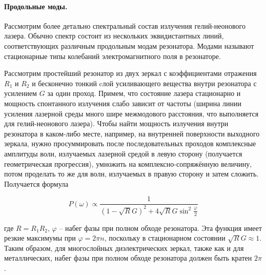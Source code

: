 \documentclass[a4paper,12pt]{article}
\theoremstyle{definition}
\begin{document}
\paragraph{Продольные моды.} Рассмотрим более детально спектральный состав излучения гелий-неонового 
лазера. Обычно спектр состоит из нескольких эквидистантных линий, соответствующих различным продольным
модам резонатора. Модами называют стационарные типы колебаний электромагнитного поля в резонаторе.
\par Рассмотрим простейший резонатор из двух зеркал с коэффициентами отражения $R_1$ и
$R_2$ и бесконечно тонкий cлой усиливающего вещества внутри резонатора с усилением
$G$ за один проход. Примем, что состояние лазера стационарно и мощность спонтанного излучения 
слабо зависит от частоты (ширина линии усиления лазерной среды много шире межмодового расстояния, 
что выполняется для гелий-неонового лазера). Чтобы найти мощность излучения внутри резонатора в 
каком-либо месте, например, на внутренней поверхности выходного зеркала, нужно просуммировать после 
последовательных проходов комплексные амплитуды волн, излучаемых лазерной средой в левую сторону 
(получается геометрическая прогрессия), умножить на комплексно-сопряжённую величину, потом проделать
то же для волн, излучаемых в правую сторону и затем сложить. Получается формула

\begin{equation}
	P(\omega) \propto \dfrac{1}{(1 - \sqrt{R}G)^2 + 4\sqrt{R}G\sin^2\frac{\varphi}{2}}
\end{equation} 

где $R = R_1R_2$, $\varphi$ -- набег фазы при полном обходе резонатора. Эта функция имеет резкие 
максимумы при $\varphi = 2\pi n$, поскольку в стационарном состоянии $\sqrt{R}G \approx 1$.
Таким образом, для многослойных диэлектрических зеркал, также как и для металлических, набег 
фазы при полном обходе резонатора должен быть кратен $2\pi$.
\end{document}
